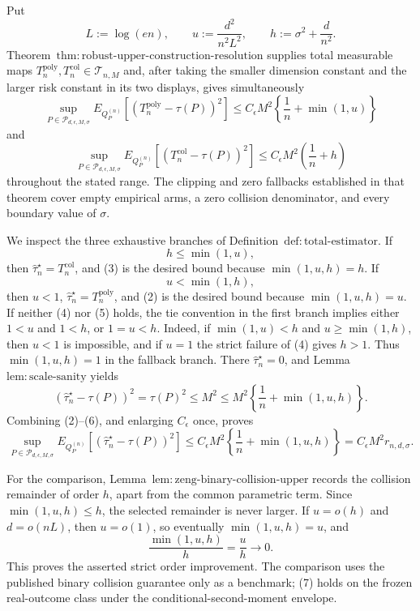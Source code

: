 Put
\[
 L:=\log(en),\qquad
 u:=\frac{d^2}{n^2L^2},\qquad
 h:=\sigma^2+\frac d{n^2}.
\tag{1}
\]
Theorem~\(\mathrm{thm:robust\text{-}upper\text{-}construction\text{-}resolution}\) supplies total measurable maps \(T_n^{\mathrm{poly}},T_n^{\mathrm{col}}\in\mathcal T_{n,M}\) and, after taking the smaller dimension constant and the larger risk constant in its two displays, gives simultaneously
\[
 \sup_{P\in\mathcal P_{d,\epsilon,M,\sigma}}
 E_{Q_P^{(n)}}[(T_n^{\mathrm{poly}}-\tau(P))^2]
 \le C_{\epsilon}M^2\left\{\frac1n+\min(1,u)\right\}
\tag{2}
\]
and
\[
 \sup_{P\in\mathcal P_{d,\epsilon,M,\sigma}}
 E_{Q_P^{(n)}}[(T_n^{\mathrm{col}}-\tau(P))^2]
 \le C_{\epsilon}M^2\left(\frac1n+h\right)
\tag{3}
\]
throughout the stated range.  The clipping and zero fallbacks established in that theorem cover empty empirical arms, a zero collision denominator, and every boundary value of \(\sigma\).

We inspect the three exhaustive branches of Definition~\(\mathrm{def:total\text{-}estimator}\).  If
\[
 h\le\min(1,u),
\tag{4}
\]
then \(\widehat\tau_n^{\star}=T_n^{\mathrm{col}}\), and (3) is the desired bound because \(\min(1,u,h)=h\).  If
\[
 u<\min(1,h),
\tag{5}
\]
then \(u<1\), \(\widehat\tau_n^{\star}=T_n^{\mathrm{poly}}\), and (2) is the desired bound because \(\min(1,u,h)=u\).  If neither (4) nor (5) holds, the tie convention in the first branch implies either \(1<u\) and \(1<h\), or \(1=u<h\).  Indeed, if \(\min(1,u)<h\) and \(u\ge\min(1,h)\), then \(u<1\) is impossible, and if \(u=1\) the strict failure of (4) gives \(h>1\).  Thus \(\min(1,u,h)=1\) in the fallback branch.  There \(\widehat\tau_n^{\star}=0\), and Lemma~\(\mathrm{lem:scale\text{-}sanity}\) yields
\[
 (\widehat\tau_n^{\star}-\tau(P))^2=\tau(P)^2
 \le M^2
 \le M^2\left\{\frac1n+\min(1,u,h)\right\}.
\tag{6}
\]
Combining (2)--(6), and enlarging \(C_{\epsilon}\) once, proves
\[
 \sup_{P\in\mathcal P_{d,\epsilon,M,\sigma}}
 E_{Q_P^{(n)}}[(\widehat\tau_n^{\star}-\tau(P))^2]
 \le C_{\epsilon}M^2
 \left\{\frac1n+\min(1,u,h)\right\}
 =C_{\epsilon}M^2r_{n,d,\sigma}.
\tag{7}
\]

For the comparison, Lemma~\(\mathrm{lem:zeng\text{-}binary\text{-}collision\text{-}upper}\) records the collision remainder of order \(h\), apart from the common parametric term.  Since \(\min(1,u,h)\le h\), the selected remainder is never larger.  If \(u=o(h)\) and \(d=o(nL)\), then \(u=o(1)\), so eventually \(\min(1,u,h)=u\), and
\[
 \frac{\min(1,u,h)}{h}=\frac uh\longrightarrow0.
\tag{8}
\]
This proves the asserted strict order improvement.  The comparison uses the published binary collision guarantee only as a benchmark; (7) holds on the frozen real-outcome class under the conditional-second-moment envelope.